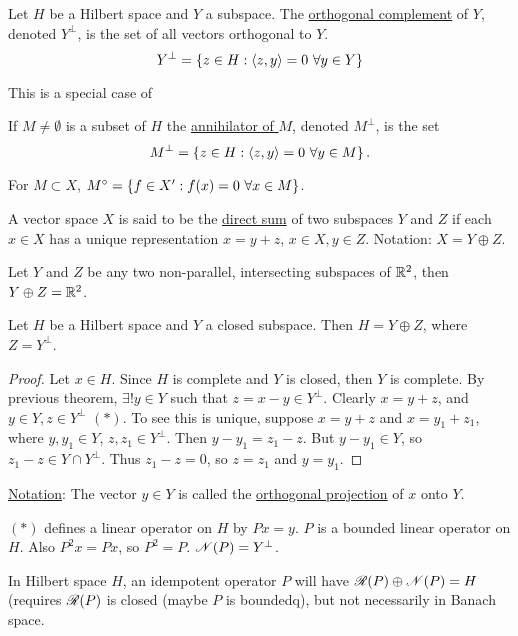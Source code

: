 \documentclass[]{article}
\begin{document}
\begin{definition}
	Let $H$ be a Hilbert space and $Y$ a subspace.
	The \ul{orthogonal complement} of $Y$, denoted $Y^\perp$, is the set of all vectors orthogonal to $Y$.
	$$ Y^\perp = \setc{z\in H}{\gen{z,y}=0\ \forall y\in Y} $$
\end{definition}
This is a special case of
\begin{definition}
	If $M\neq\emptyset$ is a subset of $H$ the \ul{annihilator of $M$}, denoted $M^\perp$, is the set $$M^\perp = \left\{ z\in H : \left\langle z,y \right\rangle=0\ \forall y\in M \right\}.$$
\end{definition}
\begin{note}
	 For $M\subset X$, $M^\circ = \left\{ f\in X' : f(x)=0\ \forall x\in M \right\}$.
\end{note}
\begin{definition}
	A vector space $X$ is said to be the \ul{direct sum} of two subspaces $Y$ and $Z$ if each $x\in X$ has a unique representation $x=y+z$, $x\in X,y\in Z$.
	Notation: $X = Y\oplus Z$.
\end{definition}
\begin{example}
	Let $Y$ and $Z$ be any two non-parallel, intersecting subspaces of $\mathbb{R}^2$, then $Y\oplus Z = \mathbb{R}^2$.
\end{example}
\newpage
\begin{theorem}
	Let $H$ be a Hilbert space and $Y$ a closed subspace. Then $H = Y\oplus Z$, where $Z = Y^\perp$.
\end{theorem}
\begin{proof}
	Let $x\in H$. Since $H$ is complete and $Y$ is closed, then $Y$ is complete.
	By previous theorem, $\exists!y\in Y$ such that $z=x-y\in Y^\perp$.
	Clearly $x=y+z$, and $y\in Y,z\in Y^\perp$ $(*)$. 
	To see this is unique, suppose $x = y+z$ and $x = y_1+z_1$, where $y,y_1\in Y$, $z,z_1\in Y^\perp$.
	Then $y-y_1=z_1-z$. But $y-y_1\in Y$, so $z_1-z\in Y\cap Y^\perp$.
	Thus $z_1-z=0$, so $z=z_1$ and $y=y_1$.
\end{proof}
\ul{Notation}: The vector $y\in Y$ is called the \ul{orthogonal projection} of $x$ onto $Y$.
\begin{note}
	$(*)$ defines a linear operator on $H$ by $Px = y$. 
	$P$ is a bounded linear operator on $H$.
	Also $P^2x = Px$, so $P^2=P$. $\mathscr{N}(P) = Y^\perp$.
\end{note}
\begin{remark}
	In Hilbert space $H$, an idempotent operator $P$ will have $\mathscr{R}(P) \oplus \mathscr{N}(P) = H$ (requires $\mathscr{R}(P)$ is closed (maybe $P$ is boundedq), but not necessarily in Banach space.
\end{remark}
\end{document}
